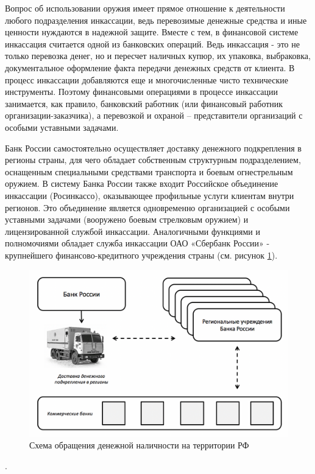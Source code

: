 \documentclass[a4paper,12pt,fleqn]{article} %
\begin{document}
Вопрос об использовании оружия имеет прямое отношение к деятельности любого подразделения инкассации, ведь перевозимые денежные средства и иные ценности нуждаются в надежной защите. Вместе с тем, в финансовой системе инкассация считается одной из банковских операций. Ведь инкассация - это не только перевозка денег, но и пересчет наличных купюр, их упаковка, выбраковка, документальное оформление факта передачи денежных средств от клиента. В процесс инкассации добавляются еще и многочисленные чисто технические инструменты. Поэтому финансовыми операциями в процессе инкассации занимается, как правило, банковский работник (или финансовый работник организации-заказчика), а перевозкой и охраной – представители организаций  с особыми уставными задачами.

Банк России самостоятельно осуществляет доставку денежного подкрепления в регионы страны, для чего обладает собственным структурным подразделением, оснащенным специальными средствами транспорта и боевым огнестрельным оружием. В систему Банка России также входит Российское объединение инкассации (Росинкассо), оказывающее профильные услуги клиентам внутри регионов. Это объединение является одновременно организацией с особыми уставными задачами (вооружено боевым стрелковым оружием) и лицензированной службой инкассации. Аналогичными функциями и полномочиями обладает служба инкассации ОАО «Сбербанк России» - крупнейшего финансово-кредитного учреждения страны (см. рисунок \ref{image9}).

\begin{figure}[h]
	\centering
	\includegraphics[scale=0.7]{img9}
	\caption{Схема обращения денежной наличности на территории РФ}
	\label{image9}
\end{figure}.
\end{document}
